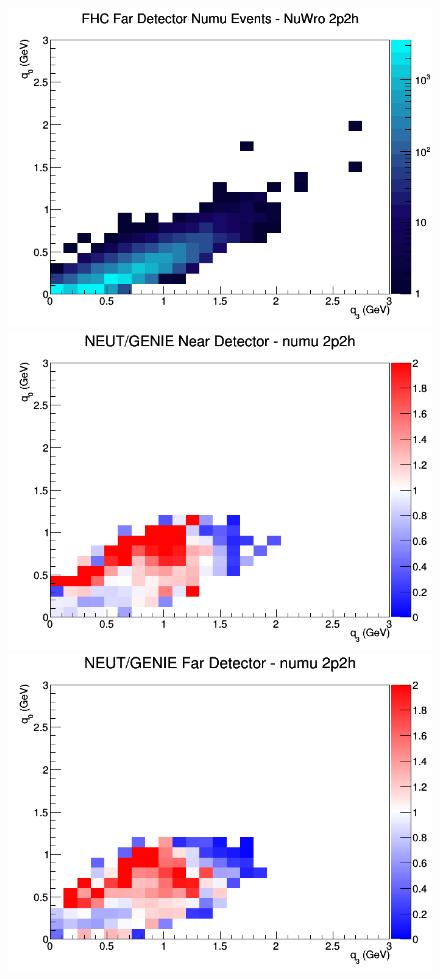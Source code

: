 \begin{figure}[h]
\endminipage
{}
\includegraphics[width=\linewidth]{eff_q0_q3/FGT/2p2h_FHC_FD_numu_q3_q0_NuWro.png}
\endminipage
\newline
{}
\includegraphics[width=\linewidth]{eff_q0_q3/FGT/ratios/2p2h_NEUT_GENIE_numu_near_q3_q0.png}
\endminipage
{}
\includegraphics[width=\linewidth]{eff_q0_q3/FGT/ratios/2p2h_NEUT_GENIE_numu_far_q3_q0.png}

\end{figure}
